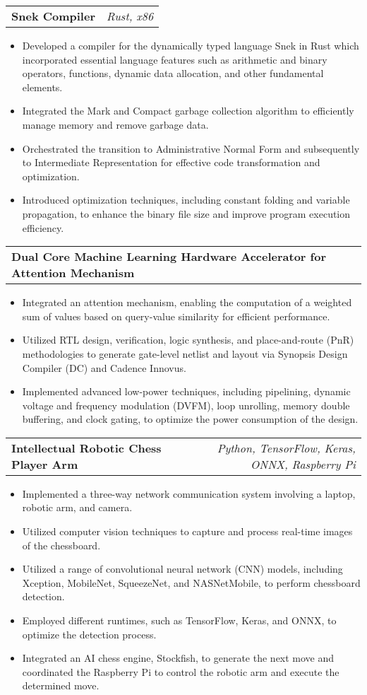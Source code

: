 \documentclass[letterpaper,11pt]{article}
\makeatletter
\newcommand{\resumeItem}[1]{
  \item\small{
    {#1 \vspace{-2pt}}
  }
}
\newcommand{\resumeProjectHeading}[2]{
    \vspace{-2pt}\item
    \begin{tabular*}{0.97\textwidth}{l@{\extracolsep{\fill}}r}
      \textcolor{secondary_color}{\textbf{#1}} & \textcolor{secondary_color}{\textit{\small #2}} \\
    \end{tabular*}\vspace{-7pt}
}
\newcommand{\resumeItemListStart}{\begin{itemize}}
\newcommand{\resumeItemListEnd}{\end{itemize}\vspace{-5pt}}
\makeatother
\begin{document}
      \resumeProjectHeading
        {\textbf{Snek Compiler}}{Rust, x86}
          \resumeItemListStart
            \resumeItem{Developed a compiler for the dynamically typed language Snek in Rust which incorporated essential language features such as arithmetic and binary operators, functions, dynamic data allocation, and other fundamental elements.}
            \resumeItem{Integrated the Mark and Compact garbage collection algorithm to efficiently manage memory and remove garbage data.}
            \resumeItem{Orchestrated the transition to Administrative Normal Form and subsequently to Intermediate Representation for effective code transformation and optimization.}
            \resumeItem{Introduced optimization techniques, including constant folding and variable propagation, to enhance the binary file size and improve program execution efficiency.}
          \resumeItemListEnd
      
      \resumeProjectHeading
        {\textbf{Dual Core Machine Learning Hardware Accelerator for Attention Mechanism}}{}
          \resumeItemListStart
            \resumeItem{Integrated an attention mechanism, enabling the computation of a weighted sum of values based on query-value similarity for efficient performance.}
            \resumeItem{Utilized RTL design, verification, logic synthesis, and place-and-route (PnR) methodologies to generate gate-level netlist and layout via Synopsis Design Compiler (DC) and Cadence Innovus.}
            \resumeItem{Implemented advanced low-power techniques, including pipelining, dynamic voltage and frequency modulation (DVFM), loop unrolling, memory double buffering, and clock gating, to optimize the power consumption of the design.}
            \resumeItemListEnd
      
      \resumeProjectHeading
        {\textbf{Intellectual Robotic Chess Player Arm}}{Python, TensorFlow, Keras, ONNX, Raspberry Pi}
          \resumeItemListStart
            \resumeItem{Implemented a three-way network communication system involving a laptop, robotic arm, and camera.}
            \resumeItem{Utilized computer vision techniques to capture and process real-time images of the chessboard.}
            \resumeItem{Utilized a range of convolutional neural network (CNN) models, including Xception, MobileNet, SqueezeNet, and NASNetMobile, to perform chessboard detection.}
            \resumeItem{Employed different runtimes, such as TensorFlow, Keras, and ONNX, to optimize the detection process.}
            \resumeItem{Integrated an AI chess engine, Stockfish, to generate the next move and coordinated the Raspberry Pi to control the robotic arm and execute the determined move.}
            \resumeItemListEnd
      
\end{document}
